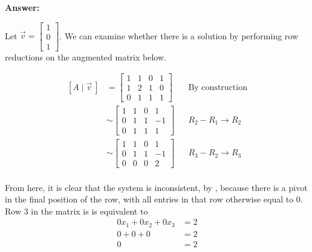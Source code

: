 \documentclass[10pt,letterpaper,final]{report}
\newcommand{\reason}[1]{&& \text{#1}}
\begin{document}
\medskip
\noindent\textbf{Answer:}
\medskip

Let $\vec{v} = \begin{bmatrix}1\\0\\1\end{bmatrix}$. We can examine whether there is a solution by performing row reductions on the augmented matrix below.

\begin{align*}
  \left[A \mid \vec{v}\ \right] & = \left[\begin{array}{rrr|r}
                                        1 & 1 & 0 & 1 \\
                                        1 & 2 & 1 & 0 \\
                                        0 & 1 & 1 & 1
                                      \end{array}\right] \reason{By construction}        \\[1ex]
                                & \sim \left[\begin{array}{rrr|r}
                                           1 & 1 & 0 & 1  \\
                                           0 & 1 & 1 & -1 \\
                                           0 & 1 & 1 & 1
                                         \end{array}\right] \reason{$R_2 - R_1 \to R_2$} \\[1ex]
                                & \sim \left[\begin{array}{rrr|r}
                                           1 & 1 & 0 & 1  \\
                                           0 & 1 & 1 & -1 \\
                                           0 & 0 & 0 & 2
                                         \end{array}\right] \reason{$R_3 - R_2 \to R_3$} \\[1ex]
\end{align*}

From here, it is clear that the system is inconsistent, by \cite[Theorem~1.2, p.~22]{LayEtAl2020LinearAlgebraAndItsApplications}, because there is a pivot in the final position of the row, with all entries in that row otherwise equal to $0$. Row 3 in the matrix is is equivalent to
\begin{align*}
  0x_1 + 0x_2 + 0x_3 & = 2 \\
  0 + 0 + 0          & = 2 \\
  0                  & = 2 \\
\end{align*}
\end{document}
